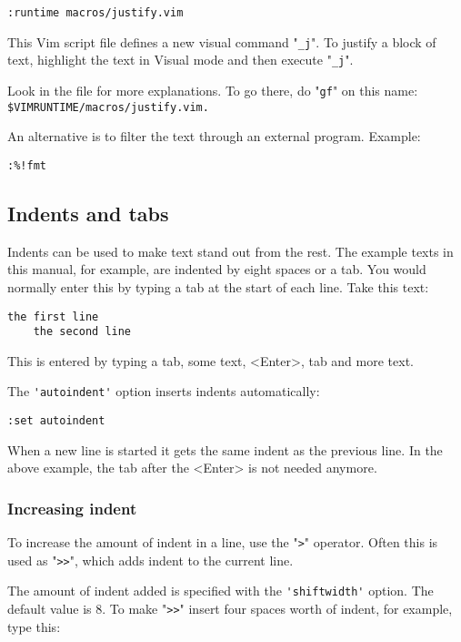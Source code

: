 \begin{Verbatim}[samepage=true]
 :runtime macros/justify.vim
\end{Verbatim}

This Vim script file defines a new visual command "\verb!_j!".
To justify a block of text, highlight the text in Visual mode and then execute "\verb!_j!".

Look in the file for more explanations.
To go there, do "\verb!gf!" on this name: \verb!$VIMRUNTIME/macros/justify.vim.!

An alternative is to filter the text through an external program.
Example:

\begin{Verbatim}[samepage=true]
 :%!fmt
\end{Verbatim}
\subsection{Indents and tabs}
\label{Indents and tabs}
Indents can be used to make text stand out from the rest.  The example texts
in this manual, for example, are indented by eight spaces or a tab.  You would
normally enter this by typing a tab at the start of each line.  Take this
text:

\begin{Verbatim}[samepage=true]
    the first line 
    the second line 
\end{Verbatim}

This is entered by typing a tab, some text, <Enter>, tab and more text.

The \verb!'autoindent'! option inserts indents automatically:

\begin{Verbatim}[samepage=true]
 :set autoindent
\end{Verbatim}

When a new line is started it gets the same indent as the previous line.
In the above example, the tab after the <Enter> is not needed anymore.

\subsubsection{Increasing indent}
To increase the amount of indent in a line, use the "\verb!>!" operator.
Often this is used as "\verb!>>!", which adds indent to the current line.

The amount of indent added is specified with the \verb!'shiftwidth'! option.
The default value is 8.
To make "\verb!>>!" insert four spaces worth of indent, for example, type this:

